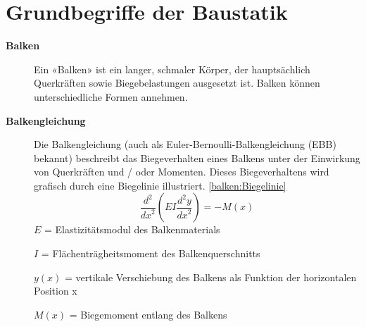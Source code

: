 %
%
%
%
\section{Grundbegriffe der Baustatik}
\label{balken:section:teil1}
\begin{description}
\item[\textbf{Balken}] Ein «Balken» ist ein langer, schmaler Körper, der hauptsächlich Querkräften sowie Biegebelastungen ausgesetzt ist.
Balken können unterschiedliche Formen annehmen.
\item[\textbf{Balkengleichung}] Die Balkengleichung (auch als Euler-Bernoulli-Balkengleichung (EBB) bekannt) beschreibt das Biegeverhalten eines Balkens unter der Einwirkung von Querkräften und / oder Momenten.
Dieses Biegeverhaltens wird grafisch durch eine Biegelinie illustriert. \ref{balken:Biegelinie}
\begin{equation}
	\frac{d^2}{{dx}^2}\left(EI\frac{d^2y}{{dx}^2}\right)
	=-M(x)
\end{equation}
$E$ = Elastizitätsmodul des Balkenmaterials

$I$ = Flächenträgheitsmoment des Balkenquerschnitts

$y(x)$ = vertikale Verschiebung des Balkens als Funktion der horizontalen Position x

$M(x)$ = Biegemoment entlang des Balkens


\end{description}
